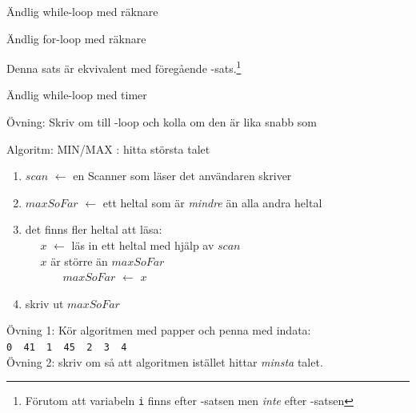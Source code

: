 \documentclass{lecturenotes}
\begin{document}
\begin{Slide}{Ändlig while-loop med räknare}

\end{Slide}


\begin{Slide}{Ändlig for-loop med räknare}

Denna sats är ekvivalent med föregående -sats.\footnote{\scriptsize Förutom att variabeln \texttt{i} finns efter -satsen men \textit{inte} efter -satsen }
\end{Slide}

\begin{Slide}{Ändlig while-loop med timer}

\scriptsize 
Övning: Skriv om till -loop och kolla om den är lika snabb som 
\end{Slide}

\begin{Slide}{Algoritm: MIN/MAX}
: hitta största talet \\ \vspace{1em}
\pause
{} 
\begin{enumerate}
\item $scan$ $\leftarrow$ en Scanner som läser det användaren skriver
\item $maxSoFar$ $\leftarrow$ ett heltal som är \textit{mindre} än alla andra heltal
\item  {} det finns fler heltal att läsa: \\
~~ $x$ $\leftarrow$ läs in ett heltal med hjälp av $scan$ \\
~~  $x$ är större än $maxSoFar$ \\
~~~~~~ $maxSoFar$ $\leftarrow$ $x$
\item skriv ut $maxSoFar$ 
\end{enumerate}
\vspace{1em} \scriptsize 
Övning 1: Kör algoritmen med papper och penna med indata: \texttt{0~~41~~1~~45~~2~~3~~4}\\ 
Övning 2: skriv om så att algoritmen istället hittar \textit{minsta} talet.
\end{Slide}
\end{document}
